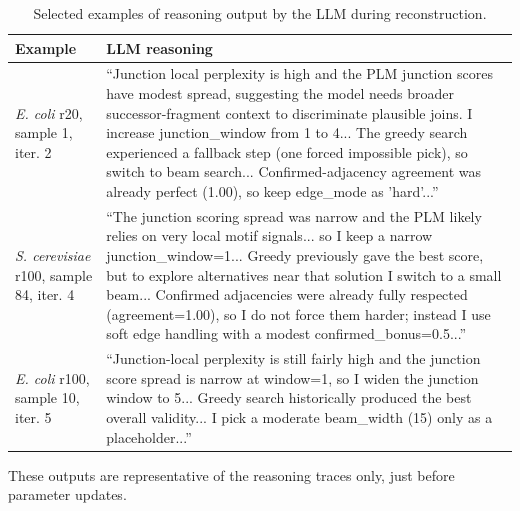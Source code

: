 \begin{table}[!tb]
  \centering
  \caption{Selected examples of reasoning output by the LLM during reconstruction.}
  \label{tab:llm_reasoning_examples}
  \small
  \setlength{\tabcolsep}{4pt}
  \begin{tabular}{@{}p{}p{}@{}}
    \toprule
    Example & LLM reasoning \\
    \midrule

    \textit{E. coli} r20, sample 1, iter. 2 &
    ``Junction local perplexity is high and the PLM junction scores have modest spread, suggesting the model needs broader successor-fragment context to discriminate plausible joins. I increase junction\_window from 1 to 4... The greedy search experienced a fallback step (one forced impossible pick), so switch to beam search... Confirmed-adjacency agreement was already perfect (1.00), so keep edge\_mode as 'hard'...'' \\

    \addlinespace

    \textit{S. cerevisiae} r100, sample 84, iter. 4 &
    ``The junction scoring spread was narrow and the PLM likely relies on very local motif signals... so I keep a narrow junction\_window=1... Greedy previously gave the best score, but to explore alternatives near that solution I switch to a small beam... Confirmed adjacencies were already fully respected (agreement=1.00), so I do not force them harder; instead I use soft edge handling with a modest confirmed\_bonus=0.5...'' \\

    \addlinespace

    \textit{E. coli} r100, sample 10, iter. 5 &
    ``Junction-local perplexity is still fairly high and the junction score spread is narrow at window=1, so I widen the junction window to 5... Greedy search historically produced the best overall validity... I pick a moderate beam\_width (15) only as a placeholder...'' \\

    \bottomrule
  \end{tabular}
  \par\smallskip
  \footnotesize{These outputs are representative of the reasoning traces only, just before parameter updates.}
\end{table}